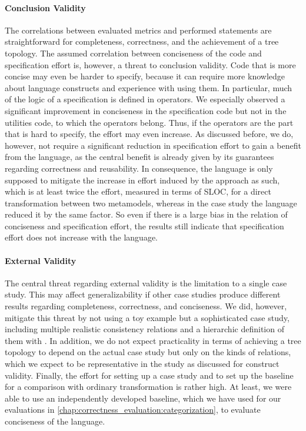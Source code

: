 \paragraph{Conclusion Validity}
The correlations between evaluated metrics and performed statements are straightforward for completeness, correctness, and the achievement of a tree topology.
The assumed correlation between conciseness of the code and specification effort is, however, a threat to conclusion validity.
Code that is more concise may even be harder to specify, because it can require more knowledge about language constructs and experience with using them.
In particular, much of the logic of a \commonalities specification is defined in operators.
We especially observed a significant improvement in conciseness in the specification code but not in the utilities code, to which the operators belong.
Thus, if the operators are the part that is hard to specify, the effort may even increase.
As discussed before, we do, however, not require a significant reduction in specification effort to gain a benefit from the \commonalities language, as the central benefit is already given by its guarantees regarding correctness and reusability.
In consequence, the language is only supposed to mitigate the increase in effort induced by the \commonalities approach as such, which is at least twice the effort, measured in terms of \gls{SLOC}, for a direct transformation between two metamodels, whereas in the case study the language reduced it by the same factor.
So even if there is a large bias in the relation of conciseness and specification effort, the results still indicate that specification effort does not increase with the \commonalities language.

\paragraph{External Validity}
The central threat regarding external validity is the limitation to a single case study.
This may affect generalizability if other case studies produce different results regarding completeness, correctness, and conciseness.
We did, however, mitigate this threat by not using a toy example but a sophisticated case study, including multiple realistic consistency relations and a hierarchic definition of them with \commonalities.
In addition, we do not expect practicality in terms of achieving a tree topology to depend on the actual case study but only on the kinds of relations, which we expect to be representative in the study as discussed for construct validity.
Finally, the effort for setting up a case study and to set up the baseline for a comparison with ordinary transformation is rather high.
At least, we were able to use an independently developed baseline, which we have used for our evaluations in \autoref{chap:correctness_evaluation:categorization}, to evaluate conciseness of the \commonalities language.


